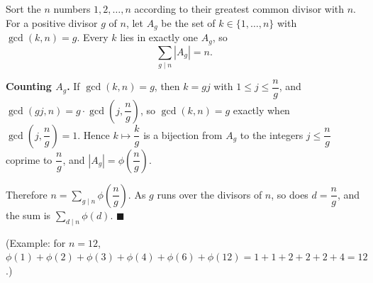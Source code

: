 Sort the $n$ numbers $1,2,\dots,n$ according to their greatest common divisor with $n$. For a positive divisor $g$ of $n$, let $A_g$ be the set of $k\in\{1,\dots,n\}$ with $\gcd(k,n)=g$. Every $k$ lies in exactly one $A_g$, so
\[\sum_{g\mid n}|A_g|=n.\]

\textbf{Counting $A_g$.} If $\gcd(k,n)=g$, then $k=gj$ with $1\le j\le\dfrac ng$, and $\gcd(gj,n)=g\cdot\gcd\left(j,\dfrac ng\right)$, so $\gcd(k,n)=g$ exactly when $\gcd\left(j,\dfrac ng\right)=1$. Hence $k\mapsto\dfrac kg$ is a bijection from $A_g$ to the integers $j\le\dfrac ng$ coprime to $\dfrac ng$, and $|A_g|=\phi\left(\dfrac ng\right)$.

Therefore $n=\sum_{g\mid n}\phi\left(\dfrac ng\right)$. As $g$ runs over the divisors of $n$, so does $d=\dfrac ng$, and the sum is $\sum_{d\mid n}\phi(d)$. $\blacksquare$

(Example: for $n=12$, $\phi(1)+\phi(2)+\phi(3)+\phi(4)+\phi(6)+\phi(12)=1+1+2+2+2+4=12$.)
